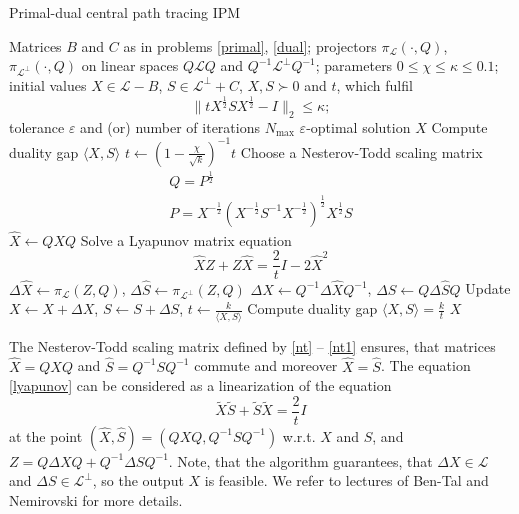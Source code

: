 \documentclass[12pt]{article}
\begin{document}
\begin{algorithm}[H]
	\caption{Primal-dual central path tracing IPM}
	\label{ipm}
	\begin{algorithmic}[1]
		\Require Matrices $B$ and $C$ as in problems \ref{primal}, \ref{dual};
		projectors $\pi_{\mathcal L}(\cdot, Q)$, $\pi_{\mathcal L^\perp}(\cdot, Q)$ on 
		linear spaces $Q \mathcal L Q$ and $Q^{-1} \mathcal L^\perp Q^{-1}$;
		parameters $0 \leq \chi \leq \kappa \leq 0.1$;
		initial values $X \in \mathcal L - B$, $S \in \mathcal L^\perp + C$, $X, S \succ 
		0$ 
		and $t$, which fulfil
		\[	
			\| t X^{\frac12} S X^{\frac12} - I \|_2 \leq \kappa;
		\]
		tolerance $\varepsilon$ and (or) number of iterations $N_{\max}$
		\Ensure $\varepsilon$-optimal solution $X$
		\State Compute duality gap $\langle X, S \rangle$
			\State $t \gets \left( 1 - \frac\chi{\sqrt{k}} \right)^{-1} t$
			\State Choose a Nesterov-Todd scaling matrix
			\begin{gather}
			\label{nt}
				 Q = P^\frac12 \\
			\label{nt1}
				 P = X^{-\frac12} \left( X^{-\frac12} S^{-1} X^{-\frac12} \right)^\frac12 
				 X^\frac12 S
			\end{gather}
			\State $\hat X \gets Q X Q$
			\State Solve a Lyapunov matrix equation
			\begin{equation}
			\label{lyapunov}
				\hat X Z + Z \hat X = \frac2t I - 2 \hat X^2
			\end{equation}
			\State $\Delta \hat X \gets \pi_{\mathcal L}(Z, Q)$, $\Delta \hat S \gets 
			\pi_{\mathcal 
			L^\perp}(Z, Q)$
			\State $\Delta X \gets Q^{-1} \Delta \hat X Q^{-1}$, $\Delta S \gets Q 
			\Delta\hat S Q$
			\State Update $X \gets X + \Delta X$, $S \gets S + \Delta S$, $t \gets \frac 
			k{\langle X, S \rangle}$
			\State Compute duality gap $\langle X, S \rangle = \frac kt$ 
		\EndWhile
		 $X$
	\end{algorithmic}
\end{algorithm}
The Nesterov-Todd scaling matrix defined by \ref{nt} -- \ref{nt1} ensures, that matrices 
$\hat X = Q 
X Q$ and $\hat S = Q^{-1} S Q^{-1}$ commute and moreover $\hat X = \hat S$. 
The equation \ref{lyapunov} can be considered as a linearization of the equation
\[
	\tilde X \tilde S + \tilde S \tilde X = \frac2t I
\]
at the point $(\hat X, \hat S) = (QXQ, Q^{-1} S Q^{-1})$ w.r.t. $X$ and $S$, and $Z = Q 
\Delta X Q + Q^{-1} \Delta S Q^{-1}$.
Note, that the algorithm guarantees, that $\Delta X \in \mathcal L$ and $\Delta S \in 
\mathcal L^\perp$, so the output $X$ is feasible.
We refer to lectures of Ben-Tal and Nemirovski \cite{nemirovski} for more details.
\end{document}
